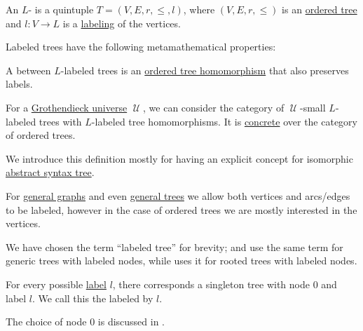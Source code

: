 \begin{definition}\label{def:labeled_tree}\mimprovised
  An \( L \)- is a quintuple \( T = (V, E, r, \leq, l) \), where \( (V, E, r, \leq) \) is an \hyperref[def:ordered_tree]{ordered tree} and \( l: V \to L \) is a \hyperref[def:labeled_set]{labeling} of the vertices.

  Labeled trees have the following metamathematical properties:
  \begin{thmenum}
     A  between \( L \)-labeled trees is an \hyperref[def:ordered_tree/homomorphism]{ordered tree homomorphism} that also preserves labels.

     For a \hyperref[def:grothendieck_universe]{Grothendieck universe} \( \mscrU \), we can consider the category of \( \mscrU \)-small \( L \)-labeled trees with \( L \)-labeled tree homomorphisms. It is \hyperref[def:concrete_category]{concrete} over the category of ordered trees.
  \end{thmenum}
\end{definition}
\begin{comments}
  \item We introduce this definition mostly for having an explicit concept for isomorphic \hyperref[con:abstract_syntax_tree]{abstract syntax tree}.

  \item For \hyperref[rem:arbitrary_graph]{general graphs} and even \hyperref[def:tree]{general trees} we allow both vertices and arcs/edges to be labeled, however in the case of ordered trees we are mostly interested in the vertices.

  We have chosen the term \enquote{labeled tree} for brevity;  and  use the same term for generic trees with labeled nodes, while  uses it for rooted trees with labeled nodes.
\end{comments}

\begin{definition}\label{def:canonical_singleton_tree}\mimprovised
  For every possible \hyperref[def:labeled_set]{label} \( l \), there corresponds a singleton tree with node \( 0 \) and label \( l \). We call this the  labeled by \( l \).

  The choice of node \( 0 \) is discussed in .
\end{definition}
